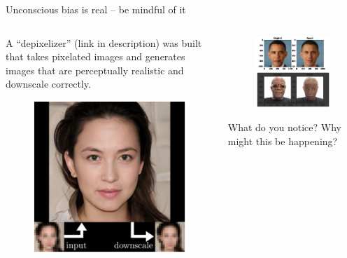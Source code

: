\documentclass[aspectratio=169]{../latex_main/tntbeamer}  %
\begin{document}
    \begin{frame}{Unconscious bias is real – be mindful of it}
    \begin{columns}
        \begin{column}{.4\textwidth}
            A “depixelizer” (link in description) was built that takes pixelated images and generates images that are perceptually realistic and downscale correctly.
            \begin{figure}
                \centering
                \includegraphics[scale=.5]{bild11}
            \end{figure}
        \end{column}
        \begin{column}{.4\textwidth}
            \begin{figure}
                \centering
                \includegraphics[scale=.35]{bild12}
            \end{figure}
            What do you notice? Why might this be happening?
        \end{column}
    \end{columns}
    
    \end{frame}
    
\end{document}
